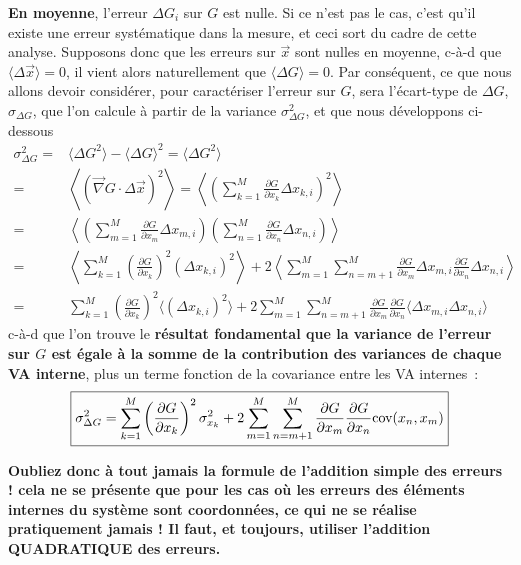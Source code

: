 \textbf{En moyenne}, l'erreur $\Delta G_i$ sur $G$ est nulle. Si ce n'est pas le cas, c'est qu'il existe une erreur systématique dans la mesure, et ceci sort du cadre de cette analyse. Supposons donc que les erreurs sur $\vec{x}$ sont nulles en moyenne, c-à-d que $\langle\Delta\vec{x}\rangle=0$, il vient alors naturellement que $\langle\Delta G\rangle=0$. Par conséquent, ce que nous allons devoir considérer, pour caractériser l'erreur sur $G$, sera l'écart-type de  $\Delta G$, $\sigma_{\Delta G}$, que l'on calcule à partir de la variance $\sigma_{\Delta G}^2$, et que nous développons ci-dessous
\begin{align*}
\sigma_{\Delta G}^2=&\langle\Delta G^2\rangle-\langle\Delta G\rangle^2=
\langle\Delta G^2\rangle\\
=&\left\langle\left(\vec{\nabla} G\cdot\Delta\vec{x}\right)^2\right\rangle=\left\langle\left(\sum\limits_{k=1}^{M}\frac{\partial G}{\partial x_k}\Delta x_{k,i}\right)^2\right\rangle\\
=&\left\langle\left(\sum\limits_{m=1}^{M}\frac{\partial G}{\partial x_m}\Delta x_{m,i}\right)\left(\sum\limits_{n=1}^{M}\frac{\partial G}{\partial x_n}\Delta x_{n,i}\right)\right\rangle\\
=&\left\langle\sum\limits_{k=1}^{M}\left(\frac{\partial G}{\partial x_k}\right)^2\left(\Delta x_{k,i}\right)^2\right\rangle+2\left\langle\sum\limits_{m=1}^{M}\sum\limits_{n=m+1}^{M}\frac{\partial G}{\partial x_m}\Delta x_{m,i}\frac{\partial G}{\partial x_n}\Delta x_{n,i}\right\rangle\\
=&\sum\limits_{k=1}^{M}\left(\frac{\partial G}{\partial x_k}\right)^2\langle\left(\Delta x_{k,i}\right)^2\rangle+2\sum\limits_{m=1}^{M}\sum\limits_{n=m+1}^{M}\frac{\partial G}{\partial x_m}\frac{\partial G}{\partial x_n}\langle\Delta x_{m,i}\Delta x_{n,i}\rangle
\end{align*}
c-à-d que l'on trouve le \textbf{résultat fondamental que la variance de l'erreur sur $G$ est égale à la somme de la contribution des variances de chaque VA interne}, plus un terme fonction de la covariance entre les VA internes~:
\begin{equation}
\boxed{\sigma^2_{\Delta G}=\sum\limits_{k=1}^{M}\left(\frac{\partial G}{\partial x_k}\right)^2\sigma_{x_k}^2
+2\sum\limits_{m=1}^{M}\sum\limits_{n=m+1}^{M}\frac{\partial G}{\partial x_m}\frac{\partial G}{\partial x_n}\text{cov}(x_n,x_m)}
\label{eq:sdg2}
\end{equation}

\begin{center}
\bf Oubliez donc à tout jamais la formule de l'addition simple des erreurs ! cela ne se présente que pour les cas où les erreurs des éléments internes du système sont coordonnées, ce qui ne se réalise pratiquement jamais ! Il faut, et toujours, utiliser l'addition QUADRATIQUE des erreurs.
\end{center}

